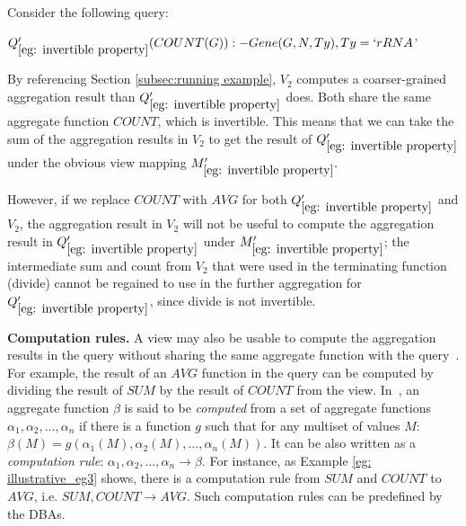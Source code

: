 \begin{example} \label{eg: invertible property}
Consider the following query:
\begin{tabbing}
$Q_{\ref{eg: invertible property}}'(COUNT(G)):- Gene(G, N, Ty), Ty = `rRNA$'
\end{tabbing}

By referencing Section \ref{subsec:running example}, $V_2$ computes a coarser-grained aggregation result than $Q_{\ref{eg: invertible property}}'$ does. Both %
share the same aggregate function $COUNT$, which is invertible. %
This means that we can take the sum of the aggregation results in $V_2$ to get the result of $Q_{\ref{eg: invertible property}}'$ under the obvious view mapping $M_{\ref{eg: invertible property}}'.$%

However, if we replace $COUNT$ with $AVG$ for both $Q_{\ref{eg: invertible property}}'$ and $V_2$,
the aggregation result in $V_2$ will not be useful to compute the aggregation result in $Q_{\ref{eg: invertible property}}'$ under $M_{\ref{eg: invertible property}}'$;  the intermediate sum and count from $V_2$ that were used in the terminating function (divide) cannot be regained to use in the further aggregation for $Q_{\ref{eg: invertible property}}'$, since divide is not invertible.
\end{example}

\textbf{Computation rules.}  
A view may also be usable to compute the aggregation results in the query without sharing the same aggregate function with the query~\cite{cohen2006user}. For example, the result of an $AVG$ function in the query can be computed by dividing the result of $SUM$ by the result of $COUNT$ from the view. In~\cite{cohen2006rewriting}, an aggregate function $\beta$ is said to be {\em computed} from a set of aggregate functions $\alpha_1, \alpha_2, \dots, \alpha_n$ if there is a function $g$ such that for any multiset of values $M$: $\beta(M) = g(\alpha_1(M), \alpha_2(M), \dots, \alpha_n(M))$. It can be also written as a {\em computation rule}: $\alpha_1, \alpha_2, \dots, \alpha_n \rightarrow \beta$. For instance, as Example \ref{eg: illustrative_eg3} shows, there is a computation rule from $SUM$ and $COUNT$ to $AVG$, i.e. $SUM, COUNT \rightarrow AVG$. Such computation rules can be predefined by the DBAs.

